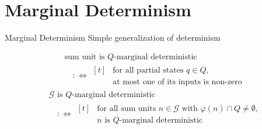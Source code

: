 \documentclass[aspectratio=169]{beamer}
\begin{document}
\section{Marginal Determinism}
  \begin{frame}{Marginal Determinism}
    Simple generalization of determinism
    \medskip
    \onslide<+->
    \begin{mybox}
      \onslide<+->
      \begin{align*}
        &\text{sum unit is $Q$-marginal deterministic} \\
        &\text{$\quad:\iff$}
        \begin{aligned}[t]
          &\text{for all partial states $q\in Q$,} \\
          &\text{at most one of its inputs is non-zero}
        \end{aligned}
      \end{align*}
      \onslide<+->
      \begin{align*}
        &\text{$\mathscr{G}$ is $Q$-marginal deterministic} \\
        &\text{$\quad:\iff$}
        \begin{aligned}[t]
          &\text{for all sum units $n\in\mathscr{G}$ with $φ(n)\cap Q\neq\emptyset$,} \\
          &\text{$n$ is $Q$-marginal deterministic}
        \end{aligned}
      \end{align*}
    \end{mybox}
  \end{frame}
\end{document}

